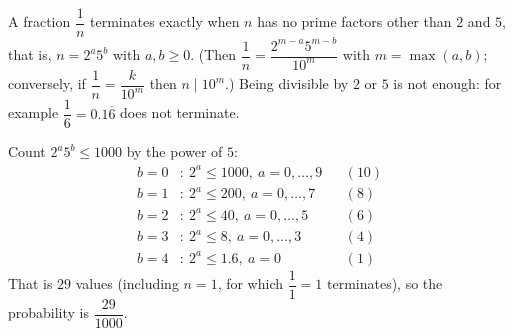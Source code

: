 A fraction $\dfrac{1}{n}$ terminates exactly when $n$ has no prime factors other than $2$ and $5$, that is, $n=2^a5^b$ with $a,b\ge0$. (Then $\dfrac{1}{n}=\dfrac{2^{m-a}5^{m-b}}{10^m}$ with $m=\max(a,b)$; conversely, if $\dfrac{1}{n}=\dfrac{k}{10^m}$ then $n\mid10^m$.) Being divisible by $2$ or $5$ is not enough: for example $\dfrac{1}{6}=0.1\overline6$ does not terminate.

Count $2^a5^b\le1000$ by the power of $5$:
\[
\begin{aligned}
b=0&:\ 2^a\le1000,\ a=0,\dots,9 &&(10)\\
b=1&:\ 2^a\le200,\ a=0,\dots,7 &&(8)\\
b=2&:\ 2^a\le40,\ a=0,\dots,5 &&(6)\\
b=3&:\ 2^a\le8,\ a=0,\dots,3 &&(4)\\
b=4&:\ 2^a\le1.6,\ a=0 &&(1)
\end{aligned}
\]
That is $29$ values (including $n=1$, for which $\dfrac{1}{1}=1$ terminates), so the probability is $\boxed{\dfrac{29}{1000}}$.
